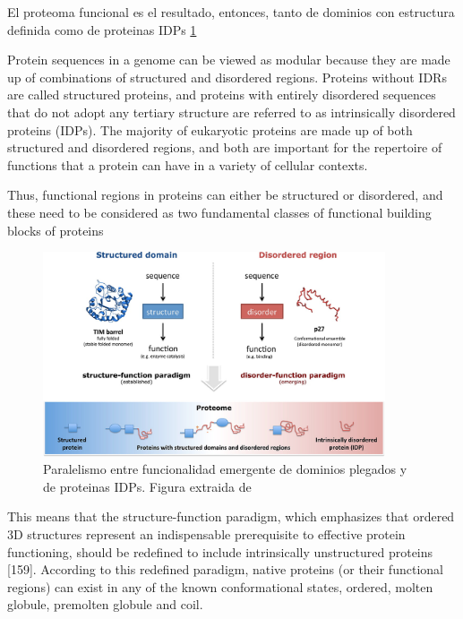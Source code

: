 
El proteoma funcional es el resultado, entonces, tanto de dominios con estructura definida como de proteinas IDPs \ref{stuctured-idp-functions}

Protein sequences in a genome can be viewed as modular because they are made up of combinations of structured and disordered regions.
Proteins without IDRs are called structured proteins, and proteins with entirely disordered sequences that do not adopt any tertiary
structure are referred to as intrinsically disordered proteins (IDPs). 
The majority of eukaryotic proteins are made up of both structured and disordered regions, and both are important for the
repertoire of functions that a protein can have in a variety of cellular contexts.

Thus, functional regions in proteins can
either be structured or disordered, and these need to be
considered as two fundamental classes of functional building
blocks of proteins


\begin{figure}[h!,centered]
\centering
\includegraphics[width=0.9\textwidth]{img/structure-idp-function.jpeg} 
\caption{Paralelismo entre funcionalidad emergente de dominios plegados y de proteinas IDPs. Figura extraida de \cite{van2014classification}}
\label{stuctured-idp-functions}
\end{figure}


This means that the structure-function paradigm, which emphasizes that ordered 3D structures represent an indispensable prerequisite to effective protein functioning, should be redefined to include intrinsically unstructured proteins [159]. 
According to this redefined paradigm, native proteins (or their functional regions) can exist in any of the known conformational states, ordered, molten globule, premolten globule and coil. 

